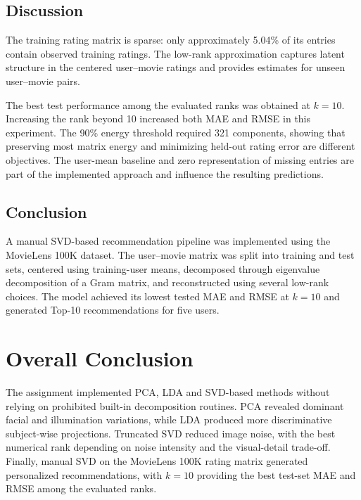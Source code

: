 \documentclass[12pt,a4paper]{report}
\begin{document}
\section{Discussion}
The training rating matrix is sparse: only approximately 5.04\% of its entries contain observed training ratings. The low-rank approximation captures latent structure in the centered user--movie ratings and provides estimates for unseen user--movie pairs.

The best test performance among the evaluated ranks was obtained at $k=10$. Increasing the rank beyond 10 increased both MAE and RMSE in this experiment. The 90\% energy threshold required 321 components, showing that preserving most matrix energy and minimizing held-out rating error are different objectives. The user-mean baseline and zero representation of missing entries are part of the implemented approach and influence the resulting predictions.

\section{Conclusion}
A manual SVD-based recommendation pipeline was implemented using the MovieLens 100K dataset. The user--movie matrix was split into training and test sets, centered using training-user means, decomposed through eigenvalue decomposition of a Gram matrix, and reconstructed using several low-rank choices. The model achieved its lowest tested MAE and RMSE at $k=10$ and generated Top-10 recommendations for five users.

\chapter{Overall Conclusion}
The assignment implemented PCA, LDA and SVD-based methods without relying on prohibited built-in decomposition routines. PCA revealed dominant facial and illumination variations, while LDA produced more discriminative subject-wise projections. Truncated SVD reduced image noise, with the best numerical rank depending on noise intensity and the visual-detail trade-off. Finally, manual SVD on the MovieLens 100K rating matrix generated personalized recommendations, with $k=10$ providing the best test-set MAE and RMSE among the evaluated ranks.
\end{document}
